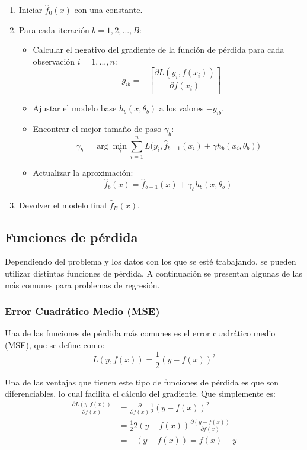 \begin{enumerate}
    \item Iniciar $\hat{f}_0(x)$ con una constante.
    \item Para cada iteración $b=1,2,...,B$:
    \begin{itemize}
        \item Calcular el negativo del gradiente de la función de pérdida para cada observación $i=1,...,n$:
        \begin{equation}
        -g_{ib} = -\left[\frac{\partial L(y_i, f(x_i))}{\partial f(x_i)}\right]
        \end{equation}
        \item Ajustar el modelo base $h_b(x,\theta_b)$ a los valores $-g_{ib}$.
        \item Encontrar el mejor tamaño de paso $\gamma_b$:
    \begin{equation}
    \gamma_b=\arg\min_{\gamma}\sum_{i=1}^{n}L\Big(y_i,\hat{f}_{b-1}(x_i)+\gamma h_b(x_i,\theta_b)\Big)    
    \end{equation}
    \item Actualizar la aproximación:
    \begin{equation}
    \hat{f}_b(x)=\hat{f}_{b-1}(x)+\gamma_b h_b(x,\theta_b)    
    \end{equation}
    \end{itemize}
    \item Devolver el modelo final $\hat{f}_B(x)$.
\end{enumerate}


\subsection{Funciones de pérdida} 
Dependiendo del problema y los datos con los que se esté trabajando, se pueden utilizar distintas funciones de pérdida. A continuación se presentan algunas de las más comunes para problemas de regresión.

\subsubsection{Error Cuadrático Medio (MSE)}

Una de las funciones de pérdida más comunes es el error cuadrático medio (MSE), que se define como:
\begin{equation}
L(y,f(x))=\frac{1}{2}(y-f(x))^2    
\end{equation}

Una de las ventajas que tienen este tipo de funciones de pérdida es que son diferenciables, lo cual facilita el cálculo del gradiente. Que simplemente es:
\begin{equation}
\begin{aligned} 
\frac{\partial L(y,f(x))}{\partial f(x)}&=\frac{\partial}{\partial f(x)}\frac{1}{2}(y-f(x))^2\\
&=\frac{1}{2}2(y-f(x))\frac{\partial(y-f(x))}{\partial f(x)}\\
&=-(y-f(x)) = f(x)-y \\
\end{aligned}
\end{equation}

